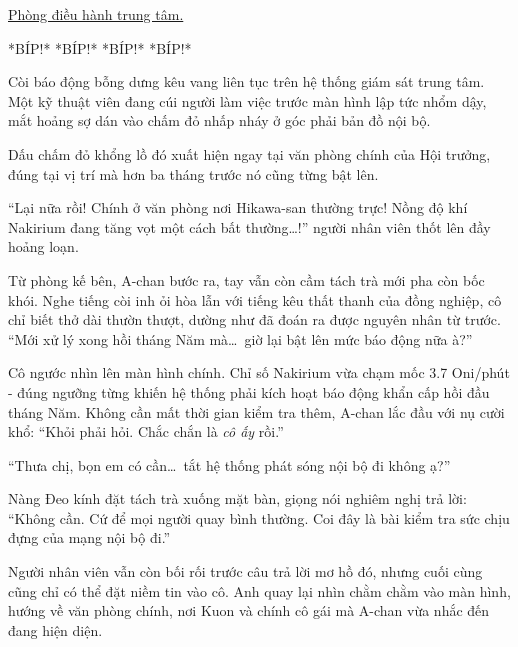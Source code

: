 \documentclass[../main.tex]{subfiles}
\begin{document}

\begin{center}
  \uline{Phòng điều hành trung tâm.}
\end{center}

*BÍP!* *BÍP!* *BÍP!* *BÍP!*

Còi báo động bỗng dưng kêu vang liên tục trên hệ thống giám sát trung tâm. Một kỹ thuật viên đang cúi người làm việc trước màn hình lập tức nhổm dậy, mắt hoảng sợ dán vào chấm đỏ nhấp nháy ở góc phải bản đồ nội bộ.

Dấu chấm đỏ khổng lồ đó xuất hiện ngay tại văn phòng chính của Hội trưởng, đúng tại vị trí mà hơn ba tháng trước nó cũng từng bật lên.

``Lại nữa rồi! Chính ở văn phòng nơi Hikawa-san thường trực! Nồng độ khí Nakirium đang tăng vọt một cách bất thường\dots!'' người nhân viên thốt lên đầy hoảng loạn.

Từ phòng kế bên, A-chan bước ra, tay vẫn còn cầm tách trà mới pha còn bốc khói. Nghe tiếng còi inh ỏi hòa lẫn với tiếng kêu thất thanh của đồng nghiệp, cô chỉ biết thở dài thườn thượt, dường như đã đoán ra được nguyên nhân từ trước. ``Mới xử lý xong hồi tháng Năm mà\dots\ giờ lại bật lên mức báo động nữa à?''

Cô ngước nhìn lên màn hình chính. Chỉ số Nakirium vừa chạm mốc 3.7 Oni/phút - đúng ngưỡng từng khiến hệ thống phải kích hoạt báo động khẩn cấp hồi đầu tháng Năm. Không cần mất thời gian kiểm tra thêm, A-chan lắc đầu với nụ cười khổ: ``Khỏi phải hỏi. Chắc chắn là \emph{cô ấy} rồi.''

``Thưa chị, bọn em có cần\dots\ tắt hệ thống phát sóng nội bộ đi không ạ?''

Nàng Đeo kính đặt tách trà xuống mặt bàn, giọng nói nghiêm nghị trả lời: ``Không cần. Cứ để mọi người quay bình thường. Coi đây là bài kiểm tra sức chịu đựng của mạng nội bộ đi.''

Người nhân viên vẫn còn bối rối trước câu trả lời mơ hồ đó, nhưng cuối cùng cũng chỉ có thể đặt niềm tin vào cô. Anh quay lại nhìn chằm chằm vào màn hình, hướng về văn phòng chính, nơi Kuon và chính cô gái mà A-chan vừa nhắc đến đang hiện diện.
\end{document}
